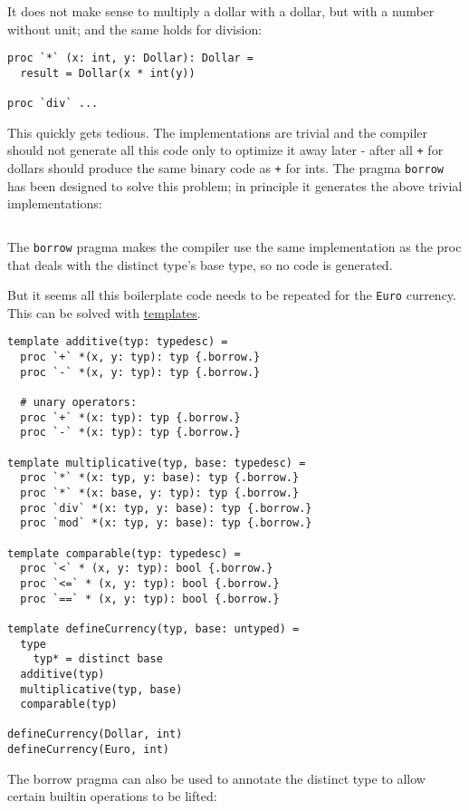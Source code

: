 It does not make sense to multiply a dollar with a dollar, but with a
number without unit; and the same holds for division:

\begin{verbatim}
proc `*` (x: int, y: Dollar): Dollar =
  result = Dollar(x * int(y))

proc `div` ...
\end{verbatim}

This quickly gets tedious. The implementations are trivial and the
compiler should not generate all this code only to optimize it away
later - after all \texttt{+} for dollars should produce the same binary
code as \texttt{+} for ints. The pragma \texttt{borrow} has been
designed to solve this problem; in principle it generates the above
trivial implementations:

\begin{verbatim}
\end{verbatim}

The \texttt{borrow} pragma makes the compiler use the same
implementation as the proc that deals with the distinct type's base
type, so no code is generated.

But it seems all this boilerplate code needs to be repeated for the
\texttt{Euro} currency. This can be solved with
\protect\hyperlink{templates}{templates}.

\begin{verbatim}
template additive(typ: typedesc) =
  proc `+` *(x, y: typ): typ {.borrow.}
  proc `-` *(x, y: typ): typ {.borrow.}

  # unary operators:
  proc `+` *(x: typ): typ {.borrow.}
  proc `-` *(x: typ): typ {.borrow.}

template multiplicative(typ, base: typedesc) =
  proc `*` *(x: typ, y: base): typ {.borrow.}
  proc `*` *(x: base, y: typ): typ {.borrow.}
  proc `div` *(x: typ, y: base): typ {.borrow.}
  proc `mod` *(x: typ, y: base): typ {.borrow.}

template comparable(typ: typedesc) =
  proc `<` * (x, y: typ): bool {.borrow.}
  proc `<=` * (x, y: typ): bool {.borrow.}
  proc `==` * (x, y: typ): bool {.borrow.}

template defineCurrency(typ, base: untyped) =
  type
    typ* = distinct base
  additive(typ)
  multiplicative(typ, base)
  comparable(typ)

defineCurrency(Dollar, int)
defineCurrency(Euro, int)
\end{verbatim}

The borrow pragma can also be used to annotate the distinct type to
allow certain builtin operations to be lifted:


